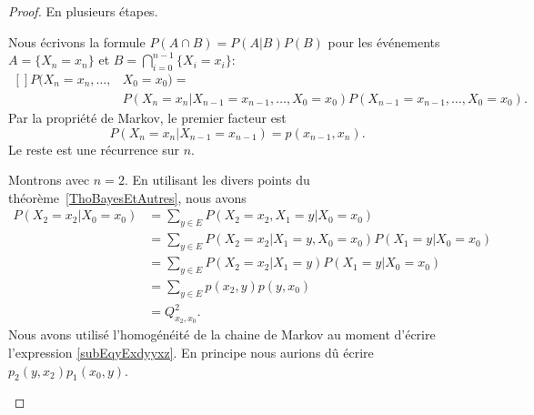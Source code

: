 \begin{proof}
	En plusieurs étapes.
	\begin{subproof}
		Nous écrivons la formule \( P(A\cap B)=P(A|B)P(B)\) pour les événements \( A=\{ X_n=x_n \}\) et \( B=\bigcap_{i=0}^{n-1}\{ X_i=x_i \}\):
		\begin{equation}
			\begin{aligned}[]
				P(X_n=x_n,\ldots, & X_0=x_0)=                                                                   \\
				\qquad            & P(X_n=x_n|X_{n-1}=x_{n-1},\ldots,X_0=x_0)P(X_{n-1}=x_{n-1},\ldots,X_0=x_0).
			\end{aligned}
		\end{equation}
		Par la propriété de Markov, le premier facteur est
		\begin{equation}
			P(X_n=x_n|X_{n-1}=x_{n-1})=p(x_{n-1},x_n).
		\end{equation}
		Le reste est une récurrence sur \( n\).

		Montrons avec \( n=2\). En utilisant les divers points du théorème~\ref{ThoBayesEtAutres}, nous avons
		\begin{subequations}
			\begin{align}
				P(X_2=x_2|X_0=x_0) & =\sum_{y\in E}P(X_2=x_2,X_1=y|X_0=x_0)                 \\
				                   & =\sum_{y\in E}P(X_2=x_2|X_1=y,X_0=x_0)P(X_1=y|X_0=x_0) \\
				                   & =\sum_{y\in E}P(X_2=x_2|X_1=y)P(X_1=y|X_0=x_0)         \\
				                   & =\sum_{y\in E}p(x_2,y)p(y,x_0) \label{subEqyExdyyxz}   \\
				                   & =Q^2_{x_2,x_0}.
			\end{align}
		\end{subequations}
		Nous avons utilisé l'homogénéité de la chaine de Markov au moment d'écrire l'expression \eqref{subEqyExdyyxz}. En principe nous aurions dû écrire \( p_2(y,x_2)p_1(x_0,y)\).


\end{subproof}
\end{proof}
